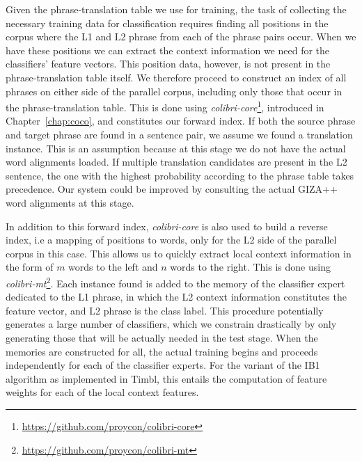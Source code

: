 Given the phrase-translation table we use for training, the task of collecting
the necessary training data for classification requires finding all positions
in the corpus where the L1 and L2 phrase from each of the phrase pairs occur.
When we have these positions we can extract the context information we need for
the classifiers' feature vectors.  This position data, however, is not present
in the phrase-translation table itself.  We therefore proceed to construct an
index of all phrases on either side of the parallel corpus, including only
those that occur in the phrase-translation table. This is done using
\emph{colibri-core}\footnote{\url{https://github.com/proycon/colibri-core}},
introduced in Chapter~\ref{chap:coco}, and constitutes our forward index.
If both the source phrase and target phrase are found in a sentence pair, we
assume we found a translation instance. This is an assumption because at this
stage we do not have the actual word alignments loaded. If multiple translation
candidates are present in the L2 sentence, the one with the highest probability
according to the phrase table takes precedence. Our system could be improved by
consulting the actual GIZA++ word alignments at this stage.

In addition to this forward index, \emph{colibri-core} is also used to build a reverse
index, i.e a mapping of positions to words, only for the L2 side of the parallel
corpus in this case. This allows us to quickly extract local context
information in the form of $m$ words to the left and $n$ words to the right.
This is done using \emph{colibri-mt}\footnote{\url{https://github.com/proycon/colibri-mt}}.
Each instance found is added to the memory of the classifier expert dedicated
to the L1 phrase, in which the L2 context information constitutes the feature
vector, and L2 phrase is the class label. This procedure potentially generates a large
number of classifiers, which we constrain drastically by only generating those
that will be actually needed in the test stage.
When the memories are constructed for all, the actual
training begins and proceeds independently for each of the classifier experts.
For the variant of the IB1 algorithm as implemented in Timbl, this entails the computation of
feature weights for each of the local context features.



